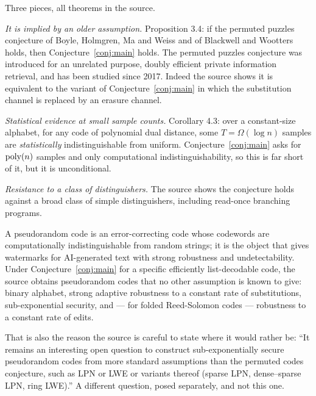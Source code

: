 \documentclass{aicr-conjecture}
\begin{document}
\begin{remark}\label{rem:evidence}
Three pieces, all theorems in the source.

\emph{It is implied by an older assumption.} Proposition 3.4: if the
permuted puzzles conjecture of Boyle, Holmgren, Ma and Weiss and of
Blackwell and Wootters holds, then Conjecture~\ref{conj:main} holds. The
permuted puzzles conjecture was introduced for an unrelated purpose,
doubly efficient private information retrieval, and has been studied
since 2017. Indeed the source shows it is equivalent to the variant of
Conjecture~\ref{conj:main} in which the substitution channel is replaced
by an erasure channel.

\emph{Statistical evidence at small sample counts.} Corollary 4.3: over a
constant-size alphabet, for any code of polynomial dual distance, some
$T = \Omega(\log n)$ samples are \emph{statistically} indistinguishable
from uniform. Conjecture~\ref{conj:main} asks for $\mathrm{poly}(n)$ samples and
only computational indistinguishability, so this is far short of it, but
it is unconditional.

\emph{Resistance to a class of distinguishers.} The source shows the
conjecture holds against a broad class of simple distinguishers,
including read-once branching programs.
\end{remark}

\begin{remark}\label{rem:stake}
A pseudorandom code is an error-correcting code whose codewords are
computationally indistinguishable from random strings; it is the object
that gives watermarks for AI-generated text with strong robustness and
undetectability. Under Conjecture~\ref{conj:main} for a specific
efficiently list-decodable code, the source obtains pseudorandom codes
that no other assumption is known to give: binary alphabet, strong
adaptive robustness to a constant rate of substitutions, sub-exponential
security, and --- for folded Reed-Solomon codes --- robustness to a
constant rate of edits.

That is also the reason the source is careful to state where it would
rather be: ``It remains an interesting open question to construct
sub-exponentially secure pseudorandom codes from more standard
assumptions than the permuted codes conjecture, such as LPN or LWE or
variants thereof (sparse LPN, dense--sparse LPN, ring LWE).'' A different
question, posed separately, and not this one.
\end{remark}
\end{document}
